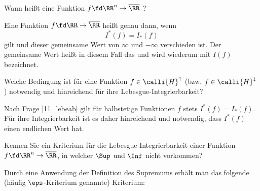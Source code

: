 \begin{frage}
  Wann hei{\ss}t eine Funktion $f\fd \RR^n\to\overline{\RR}$ 
  ?
\end{frage}

\begin{antwort}
  
  Eine Funktion $f\fd \RR\to\overline{\RR}$ hei{\ss}t 
   genau dann, wenn 
  \[
  \boxed{ I^*(f)=I_*(f) }
  \]
  gilt und dieser gemeinsame Wert von $\infty$ und $-\infty$ verschieden ist. 
  Der gemeinsame Wert hei{\ss}t in diesem Fall das 
   und wird wiederum mit $I(f)$ bezeichnet. 
  \AntEnd
\end{antwort} 

\begin{frage}
  Welche Bedingung ist für eine Funktion $f\in \calli{H}^\uparrow$ 
  (bzw. $f\in \calli{H}^\downarrow$) notwendig und hinreichend 
  für ihre Lebesgue-Integrierbarkeit?
\end{frage}

\begin{antwort}
  Nach Frage \ref{11_lebeab} gilt für halbstetige Funktionen 
  $f$ stets $I^*(f)=I_*(f)$. Für ihre Integrierbarkeit ist es 
  daher hinreichend und notwendig, dass $I^*(f)$ einen endlichen Wert 
  hat. \AntEnd
\end{antwort} 

\begin{frage}\label{11_lebekrit}
  Kennen Sie ein Kriterium f\"ur die Lebesgue-Integrierbarkeit einer 
  Funktion $f\fd \RR^n \to \overline{\RR}$, in welcher $\Sup$ und $\Inf$ 
  nicht vorkommen?
\end{frage}

\begin{antwort}
  Durch eine Anwendung der Definition 
  des Supremums erh\"alt man {\zB} das folgende 
  (häufig $\eps$-Kriterium genannte) Kriterium: 

  \medskip\noindent
\end{antwort}

